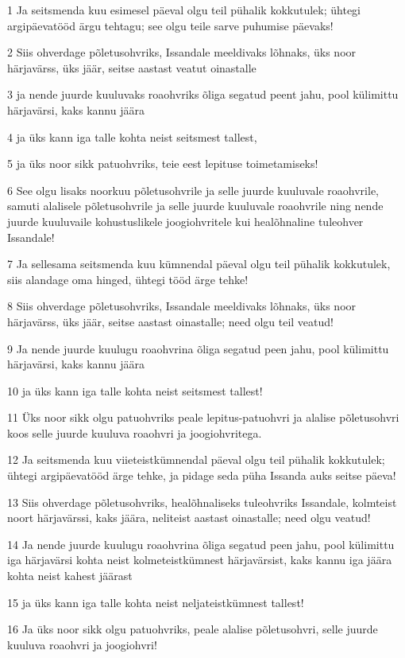 \par 1 Ja seitsmenda kuu esimesel päeval olgu teil pühalik kokkutulek; ühtegi argipäevatööd ärgu tehtagu; see olgu teile sarve puhumise päevaks!
\par 2 Siis ohverdage põletusohvriks, Issandale meeldivaks lõhnaks, üks noor härjavärss, üks jäär, seitse aastast veatut oinastalle
\par 3 ja nende juurde kuuluvaks roaohvriks õliga segatud peent jahu, pool külimittu härjavärsi, kaks kannu jäära
\par 4 ja üks kann iga talle kohta neist seitsmest tallest,
\par 5 ja üks noor sikk patuohvriks, teie eest lepituse toimetamiseks!
\par 6 See olgu lisaks noorkuu põletusohvrile ja selle juurde kuuluvale roaohvrile, samuti alalisele põletusohvrile ja selle juurde kuuluvale roaohvrile ning nende juurde kuuluvaile kohustuslikele joogiohvritele kui healõhnaline tuleohver Issandale!
\par 7 Ja sellesama seitsmenda kuu kümnendal päeval olgu teil pühalik kokkutulek, siis alandage oma hinged, ühtegi tööd ärge tehke!
\par 8 Siis ohverdage põletusohvriks, Issandale meeldivaks lõhnaks, üks noor härjavärss, üks jäär, seitse aastast oinastalle; need olgu teil veatud!
\par 9 Ja nende juurde kuulugu roaohvrina õliga segatud peen jahu, pool külimittu härjavärsi, kaks kannu jäära
\par 10 ja üks kann iga talle kohta neist seitsmest tallest!
\par 11 Üks noor sikk olgu patuohvriks peale lepitus-patuohvri ja alalise põletusohvri koos selle juurde kuuluva roaohvri ja joogiohvritega.
\par 12 Ja seitsmenda kuu viieteistkümnendal päeval olgu teil pühalik kokkutulek; ühtegi argipäevatööd ärge tehke, ja pidage seda püha Issanda auks seitse päeva!
\par 13 Siis ohverdage põletusohvriks, healõhnaliseks tuleohvriks Issandale, kolmteist noort härjavärssi, kaks jäära, neliteist aastast oinastalle; need olgu veatud!
\par 14 Ja nende juurde kuulugu roaohvrina õliga segatud peen jahu, pool külimittu iga härjavärsi kohta neist kolmeteistkümnest härjavärsist, kaks kannu iga jäära kohta neist kahest jäärast
\par 15 ja üks kann iga talle kohta neist neljateistkümnest tallest!
\par 16 Ja üks noor sikk olgu patuohvriks, peale alalise põletusohvri, selle juurde kuuluva roaohvri ja joogiohvri!
